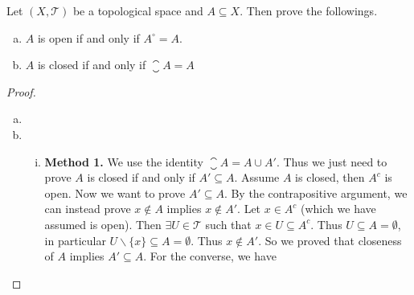 \begin{problem}
	Let $(X,\mathcal{T})$ be a topological space and $A \subseteq X$. Then prove the followings.
	\begin{enumerate}[(a)]
		\item $A$ is open if and only if $A^\circ = A$.
		\item $A$ is closed if and only if $\closure{A} = A$
	\end{enumerate}
\end{problem}
\begin{proof}
	\begin{enumerate}[(a)]
		\item 
		\item 
		\begin{enumerate}[(i)]
			\item \textbf{Method 1.} We use the identity $\closure{A} = A \cup A'$. Thus we just need to prove $A$ is closed if and only if $A' \subseteq A$. Assume $A$ is closed, then $A^c$ is open. Now we want to prove $A' \subseteq A$. By the contrapositive argument, we can instead prove $x\notin A$ implies $x \notin A'$. Let $x \in A^c$ (which we have assumed is open). Then $\exists U \in \mathcal{T}$ such that $x \in U \subseteq A^c$. Thus $U \subseteq A = \emptyset$, in particular $U \backslash \{x\} \subseteq A = \emptyset$. Thus $x \notin A'$. So we proved that closeness of $A$ implies $A' \subseteq A$. For the converse, we have 
		\end{enumerate}
	\end{enumerate}
\end{proof}
 